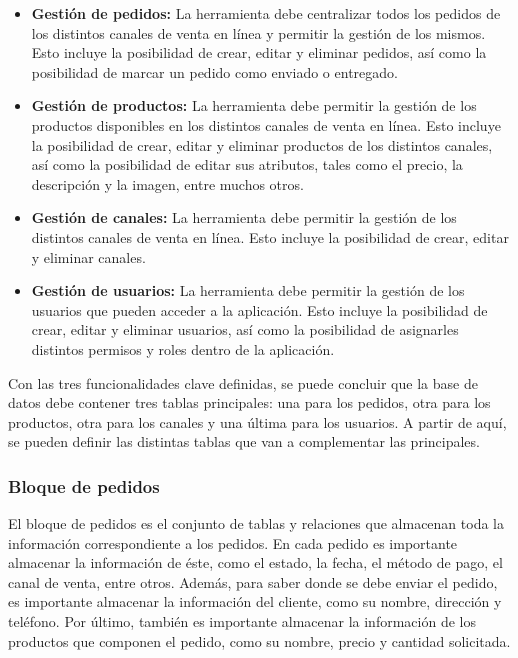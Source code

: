 \begin{itemize}
    \item \textbf{Gestión de pedidos:} La herramienta debe centralizar todos los pedidos de los distintos canales de venta en línea y permitir la gestión de los mismos. Esto incluye la posibilidad de crear, editar y eliminar pedidos, así como la posibilidad de marcar un pedido como enviado o entregado.
    \item \textbf{Gestión de productos:} La herramienta debe permitir la gestión de los productos disponibles en los distintos canales de venta en línea. Esto incluye la posibilidad de crear, editar y eliminar productos de los distintos canales, así como la posibilidad de editar sus atributos, tales como el precio, la descripción y la imagen, entre muchos otros.
    \item \textbf{Gestión de canales:} La herramienta debe permitir la gestión de los distintos canales de venta en línea. Esto incluye la posibilidad de crear, editar y eliminar canales.
    \item \textbf{Gestión de usuarios:} La herramienta debe permitir la gestión de los usuarios que pueden acceder a la aplicación. Esto incluye la posibilidad de crear, editar y eliminar usuarios, así como la posibilidad de asignarles distintos permisos y roles dentro de la aplicación.
\end{itemize}

Con las tres funcionalidades clave definidas, se puede concluir que la base de datos debe contener tres tablas principales: una para los pedidos, otra para los productos, otra para los canales y una última para los usuarios. A partir de aquí, se pueden definir las distintas tablas que van a complementar las principales.

\subsubsection{Bloque de pedidos}

El bloque de pedidos es el conjunto de tablas y relaciones que almacenan toda la información correspondiente a los pedidos. En cada pedido es importante almacenar la información de éste, como el estado, la fecha, el método de pago, el canal de venta, entre otros. Además, para saber donde se debe enviar el pedido, es importante almacenar la información del cliente, como su nombre, dirección y teléfono. Por último, también es importante almacenar la información de los productos que componen el pedido, como su nombre, precio y cantidad solicitada.

